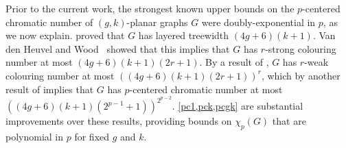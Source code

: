 \documentclass{patmorin}
\begin{document}

Prior to the current work, the strongest known upper bounds on the $p$-centered chromatic number of $(g,k)$-planar graphs $G$ were doubly-exponential in $p$, as we now explain. 
\citet{dujmovic.eppstein.ea:structure} proved that $G$ has layered treewidth $(4g+6)(k+1)$. 
Van den Heuvel and Wood~\citep{vdHW17} showed that this implies that $G$  has $r$-strong colouring number at most $(4g + 6)(k + 1)(2r + 1)$. By a result of \citet{zhu:colouring}, $G$ has $r$-weak colouring number at most $( (4g + 6)(k + 1)(2r + 1) )^r$, which by another result of  \citet{zhu:colouring} implies that $G$ has  $p$-centered chromatic number at most $( (4g+6)(k+1)(2^{p-1} + 1) )^{2^{p-2}}$. 
\cref{pc1,pck,pcgk} are substantial improvements over these results, providing bounds on $\chi_p(G)$ that are polynomial in $p$ for fixed $g$ and $k$. 
\end{document}
